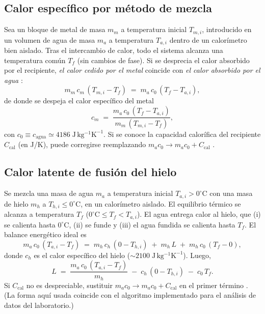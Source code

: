 \documentclass[11pt,twocolumn]{article}
\makeatletter
\let\orig@cite\cite
\renewcommand{\cite}[1]{\textcolor{Blue}{\orig@cite{#1}}}
\let\orig@parencite\parencite
\renewcommand{\parencite}[1]{\textcolor{Blue}{\orig@parencite{#1}}}
\renewcommand{\cite}[1]{\parencite{#1}}      %
\let\orig@cite\cite
\renewcommand{\cite}[1]{\textcolor{Blue}{\orig@cite{#1}}} %
\makeatother
\begin{document}
\subsection{Calor específico por método de mezcla}
Sea un bloque de metal de masa $m_m$ a temperatura inicial $T_{m,i}$, introducido en un volumen de agua 
de masa $m_a$ a temperatura $T_{a,i}$ dentro de un calorímetro bien aislado. Tras el intercambio de calor,
todo el sistema alcanza una temperatura común $T_f$ (sin cambios de fase). Si se desprecia el calor absorbido
por el recipiente, \emph{el calor cedido por el metal} coincide con \emph{el calor absorbido por el agua}
\cite{serway,tipler}:
\begin{equation*}
    m_m\,c_m\,(T_{m,i}-T_f) \;=\; m_a\,c_0\,(T_f - T_{a,i}),
\end{equation*}
de donde se despeja el calor específico del metal
\begin{equation*}
    c_m \;=\; \frac{m_a\,c_0\,(T_f - T_{a,i})}{m_m\,(T_{m,i}-T_f)},
\end{equation*}
con $c_0 \equiv c_{\text{agua}} \simeq 4186\;\mathrm{J\,kg^{-1}K^{-1}}$. Si se conoce la capacidad calorífica del
recipiente $C_{\text{cal}}$ (en J/K), puede corregirse reemplazando $m_a c_0 \to m_a c_0 + C_{\text{cal}}$ \cite{halliday}.

\subsection{Calor latente de fusión del hielo}
Se mezcla una masa de agua $m_a$ a temperatura inicial $T_{a,i}>0^\circ\mathrm{C}$ con una masa de hielo $m_h$
a $T_{h,i}\le 0^\circ\mathrm{C}$, en un calorímetro aislado. El equilibrio térmico se alcanza a temperatura $T_f$
($0^\circ\mathrm{C}\le T_f < T_{a,i}$). El agua entrega calor al hielo, que (i) se calienta hasta $0^\circ\mathrm{C}$,
(ii) se funde y (iii) el agua fundida se calienta hasta $T_f$. El balance energético ideal es \cite{serway,tipler,zemansky}
\begin{equation*}
    m_a\,c_0\,(T_{a,i}-T_f) \;=\; m_h\,c_h\,(0 - T_{h,i}) \;+\; m_h\,L \;+\; m_h\,c_0\,(T_f - 0),
\end{equation*}
donde $c_h$ es el calor específico del hielo ($\sim\!2100\;\mathrm{J\,kg^{-1}K^{-1}}$). Luego,
\begin{equation*}
    L \;=\; \frac{m_a\,c_0\,(T_{a,i}-T_f)}{m_h} \;-\; c_h\,(0 - T_{h,i}) \;-\; c_0\,T_f.
\end{equation*}
Si $C_{\text{cal}}$ no es despreciable, sustituir $m_a c_0 \to m_a c_0 + C_{\text{cal}}$ en el primer término \cite{halliday}.
(La forma aquí usada coincide con el algoritmo implementado para el análisis de datos del laboratorio.)
\end{document}
